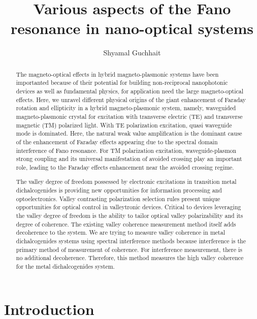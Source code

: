 \documentclass[13pt]{article}
\title{Various aspects of the Fano resonance in nano-optical systems}
\author{Shyamal Guchhait}
\date{}
\begin{document}
	
	\maketitle
	
	\begin{abstract}
		The magneto-optical effects in hybrid magneto-plasmonic systems have been importanted because of their potential for building non-reciprocal nanophotonic devices as well as fundamental physics, for application need the large magneto-optical effects. Here, we unravel different physical origins of the giant enhancement of Faraday rotation and ellipticity in a hybrid magneto-plasmonic system, namely, waveguided magneto-plasmonic crystal for excitation with transverse electric (TE) and transverse magnetic (TM) polarized light. With TE polarization excitation, quasi waveguide mode is dominated. Here, the natural weak value amplification is the dominant cause of the enhancement of Faraday effects appearing due to the spectral domain interference of Fano resonance. For TM polarization excitation, waveguide-plasmon strong coupling and its universal manifestation of avoided crossing play an important role, leading to the Faraday effects enhancement near the avoided crossing regime.
		\par
		The valley degree of freedom possessed by electronic excitations in transition metal dichalcogenides is providing new opportunities for information processing and optoelectronics. Valley contrasting polarization selection rules present unique opportunities for optical control in valleytronic devices. Critical to devices leveraging the valley degree of freedom is the ability to tailor optical valley polarizability and its degree of coherence. The existing valley coherence measurement method itself adds decoherence to the system. We are trying to measure valley coherence in metal dichalcogenides systems using spectral interference methods because interference is the primary method of measurement of coherence. For interference measurement, there is no additional decoherence. Therefore, this method measures the high valley coherence for the metal dichalcogenides system.
		
	\end{abstract}
	\section{Introduction}
\end{document}
